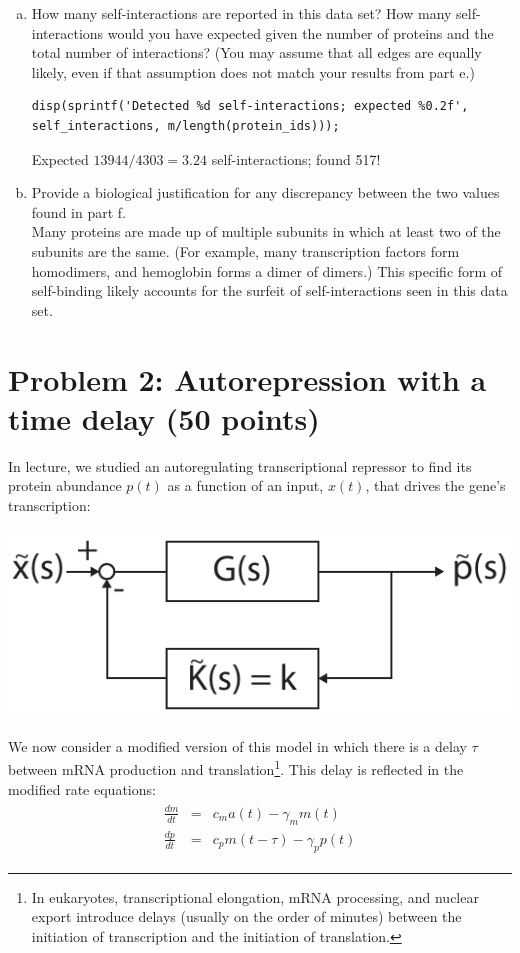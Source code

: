 \documentclass{article}
\begin{document}
\begin{enumerate}[a)]
{Answers need not be this detailed and may vary.

}

\item How many self-interactions are reported in this data set? How many self-interactions would you have expected given the number of proteins and the total number of interactions? (You may assume that all edges are equally likely, even if that assumption does not match your results from part e.)

\begin{lstlisting}
disp(sprintf('Detected %d self-interactions; expected %0.2f', self_interactions, m/length(protein_ids)));
\end{lstlisting}

{\color{red}
Expected $13944/4303 = 3.24$ self-interactions; found 517!
}

\item Provide a biological justification for any discrepancy between the two values found in part f.\\

{\color{red}
Many proteins are made up of multiple subunits in which at least two of the subunits are the same. (For example, many transcription factors form homodimers, and hemoglobin forms a dimer of dimers.) This specific form of self-binding likely accounts for the surfeit of self-interactions seen in this data set.
}

\end{enumerate}

\section*{Problem 2: Autorepression with a time delay (50 points)}


In lecture, we studied an autoregulating transcriptional repressor to find its protein abundance $p(t)$ as a function of an input, $x(t)$, that drives the gene's transcription:

\begin{center}\includegraphics[width=0.4 \textwidth]{autorepression.pdf}\end{center}

We now consider a modified version of this model in which there is a delay $\tau$ between mRNA production and translation\footnote{In eukaryotes, transcriptional elongation, mRNA processing, and nuclear export introduce delays (usually on the order of minutes) between the initiation of transcription and the initiation of translation.}. This delay is reflected in the modified rate equations:
\begin{eqnarray}
\begin{aligned}
\frac{d m}{dt} & = & c_m a(t) - \gamma_m m(t)\\
\frac{d p}{d t} & = & c_p m(t-\tau) - \gamma_p p(t) \label{eqn:rateequations}
\end{aligned}
\end{eqnarray}
\end{document}
